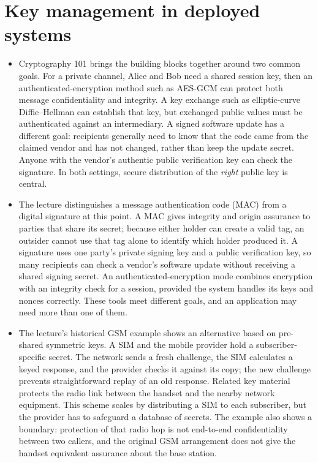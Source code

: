 \documentclass[10pt]{article}
\begin{document}
\section*{Key management in deployed systems}

\begin{itemize}[leftmargin=1.25em, itemsep=0.3em, parsep=0pt, topsep=0pt]
    \item Cryptography 101 brings the building blocks together around two common goals. For a private channel, Alice and Bob need a shared session key, then an authenticated-encryption method such as AES-GCM can protect both message confidentiality and integrity. A key exchange such as elliptic-curve Diffie--Hellman can establish that key, but exchanged public values must be authenticated against an intermediary. A signed software update has a different goal: recipients generally need to know that the code came from the claimed vendor and has not changed, rather than keep the update secret. Anyone with the vendor's authentic public verification key can check the signature. In both settings, secure distribution of the \emph{right} public key is central.

    \item The lecture distinguishes a message authentication code (MAC) from a digital signature at this point. A MAC gives integrity and origin assurance to parties that share its secret; because either holder can create a valid tag, an outsider cannot use that tag alone to identify which holder produced it. A signature uses one party's private signing key and a public verification key, so many recipients can check a vendor's software update without receiving a shared signing secret. An authenticated-encryption mode combines encryption with an integrity check for a session, provided the system handles its keys and nonces correctly. These tools meet different goals, and an application may need more than one of them.

    \item The lecture's historical GSM example shows an alternative based on pre-shared symmetric keys. A SIM and the mobile provider hold a subscriber-specific secret. The network sends a fresh challenge, the SIM calculates a keyed response, and the provider checks it against its copy; the new challenge prevents straightforward replay of an old response. Related key material protects the radio link between the handset and the nearby network equipment. This scheme scales by distributing a SIM to each subscriber, but the provider has to safeguard a database of secrets. The example also shows a boundary: protection of that radio hop is not end-to-end confidentiality between two callers, and the original GSM arrangement does not give the handset equivalent assurance about the base station.


\end{itemize}
\end{document}
